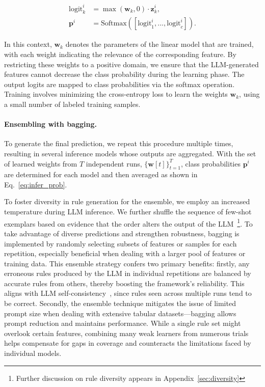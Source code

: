 \begin{align}
\text{logit}_k^i &= \max(\mathbf{w}_k, 0) \cdot \mathbf{z}_k^i, \nonumber \\
\mathbf{p}^i &= \text{Softmax}({[\text{logit}_{1}^i, ..., \text{logit}_{c}^i]}). \label{eq:infer_prob}
\end{align}

In this context, $\mathbf{w}_k$ denotes the parameters of the linear model that are trained, with each weight indicating the relevance of the corresponding feature. By restricting these weights to a positive domain, we ensure that the LLM-generated features cannot decrease the class probability during the learning phase. The output logits are mapped to class probabilities via the softmax operation. Training involves minimizing the cross-entropy loss to learn the weights $\mathbf{w}_k$, using a small number of labeled training samples.

\vspace*{-0.12in}
\paragraph{Ensembling with bagging.} To generate the final prediction, we repeat this procedure multiple times, resulting in several inference models whose outputs are aggregated. With the set of learned weights from $T$ independent runs, $\{\mathbf{w}[t]\}_{t=1}^T$, class probabilities $\mathbf{p}^i$ are determined for each model and then averaged as shown in Eq.~\ref{eq:infer_prob}.

To foster diversity in rule generation for the ensemble, we employ an increased temperature during LLM inference. We further shuffle the sequence of few-shot exemplars based on evidence that the order alters the output of the LLM~\cite{lu2022fantastically}\footnote{Further discussion on rule diversity appears in Appendix~\ref{sec:diversity}}. To take advantage of diverse predictions and strengthen robustness, bagging is implemented by randomly selecting subsets of features or samples for each repetition, especially beneficial when dealing with a larger pool of features or training data. This ensemble strategy confers two primary benefits: firstly, any erroneous rules produced by the LLM in individual repetitions are balanced by accurate rules from others, thereby boosting the framework's reliability. This aligns with LLM self-consistency~\cite{wang2022self}, since rules seen across multiple runs tend to be correct. Secondly, the ensemble technique mitigates the issue of limited prompt size when dealing with extensive tabular datasets—bagging allows prompt reduction and maintains performance. While a single rule set might overlook certain features, combining many weak learners from numerous trials helps compensate for gaps in coverage and counteracts the limitations faced by individual models.

